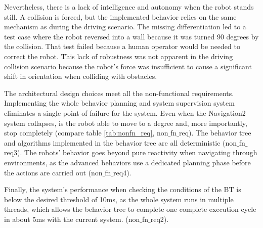 Nevertheless, there is a lack of intelligence and autonomy when the robot stands still. A collision is forced, but the implemented behavior relies on the same mechanism as during the driving scenario. The missing differentiation led to a test case where the robot reversed into a wall because it was turned 90 degrees by the collision. That test failed because a human operator would be needed to correct the robot. This lack of robustness was not apparent in the driving collision scenario because the robot's force was insufficient to cause a significant shift in orientation when colliding with obstacles. 

\begin{table}[ht]
	\centering
	\caption{Results}
	\label{tab:results}
	\renewcommand{\arraystretch}{1.5}
\end{table} 

The architectural design choices meet all the non-functional requirements. Implementing the whole behavior planning and system supervision system eliminates a single point of failure for the system. Even when the Navigation2 system collapses, is the robot able to move to a degree and, more importantly, stop completely (compare table \ref{tab:nonfn_req}, non$\_$fn$\_$req). The behavior tree and algorithms implemented in the behavior tree are all deterministic (non$\_$fn$\_$req3). The robots' behavior goes beyond pure reactivity when navigating through environments, as the advanced behaviors use a dedicated planning phase before the actions are carried out (non$\_$fn$\_$req4). 

Finally, the system's performance when checking the conditions of the BT is below the desired threshold of 10ms, as the whole system runs in multiple threads, which allows the behavior tree to complete one complete execution cycle in about 5ms with the current system. (non$\_$fn$\_$req2). 